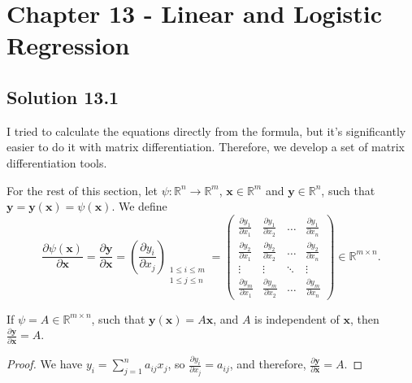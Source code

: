 \section*{Chapter 13 - Linear and Logistic Regression}

\subsection*{Solution 13.1}

I tried to calculate the equations directly from the formula, but it's significantly easier to do it with matrix differentiation.
Therefore, we develop a set of matrix differentiation tools.

For the rest of this section, let $\psi: \mathbb{R}^n \to \mathbb{R}^m$, $\bm{x} \in \mathbb{R}^m$ and $\bm{y} \in \mathbb{R}^n$, such that $\bm{y} = \bm{y}(\bm{x}) = \psi(\bm{x})$.
We define
\begin{equation*}
    \frac{\partial \psi(\bm{x})}{\partial \bm{x}}
        = \frac{\partial \bm{y}}{\partial \bm{x}}
        = \left( \frac{\partial y_i}{\partial x_j} \right)_{\substack{1 \leq i \leq m \\ 1 \leq j \leq n}}
        = \left( \begin{matrix}
            \frac{\partial y_1}{\partial x_1} & \frac{\partial y_1}{\partial x_2} & \ldots & \frac{\partial y_1}{\partial x_n} \\
            \frac{\partial y_2}{\partial x_1} & \frac{\partial y_2}{\partial x_2} & \ldots & \frac{\partial y_2}{\partial x_n} \\
            \vdots & \vdots & \ddots & \vdots \\
            \frac{\partial y_m}{\partial x_1} & \frac{\partial y_m}{\partial x_2} & \ldots & \frac{\partial y_m}{\partial x_n}
        \end{matrix} \right)
        \in \mathbb{R}^{m \times n}.
\end{equation*}


\begin{theorem} \label{md1}
If $\psi = A \in \mathbb{R}^{m \times n}$, such that $\bm{y}(\bm{x}) = A\bm{x}$, and $A$ is independent of $\bm{x}$, then $\frac{\partial \bm{y}}{\partial \bm{x}} = A$.
\end{theorem}

\begin{proof}
We have $y_i = \sum_{j = 1}^n a_{ij} x_j$, so $\frac{\partial y_i}{\partial x_j} = a_{ij}$, and therefore, $\frac{\partial \bm{y}}{\partial \bm{x}} = A$.
\end{proof}


